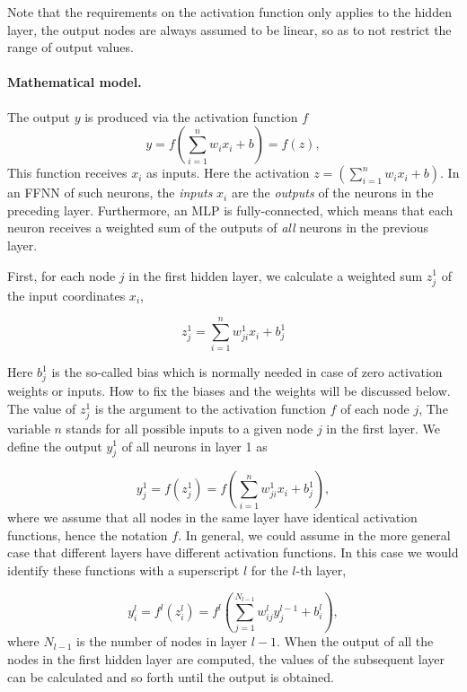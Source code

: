 \documentclass[%
oneside,                 %
final,                   %
10pt]{article}
\begin{document}
Note that the requirements on the activation function only applies to
the hidden layer, the output nodes are always assumed to be linear, so
as to not restrict the range of output values.


\paragraph{Mathematical model.}
The output $y$ is produced via the activation function $f$
\[
 y = f\left(\sum_{i=1}^n w_ix_i + b \right) = f(z),
\]
This function receives $x_i$ as inputs.
Here the activation $z=(\sum_{i=1}^n w_ix_i+b)$. 
In an FFNN of such neurons, the \emph{inputs} $x_i$ are the \emph{outputs} of
the neurons in the preceding layer. Furthermore, an MLP is
fully-connected, which means that each neuron receives a weighted sum
of the outputs of \emph{all} neurons in the previous layer.

First, for each node $j$ in the first hidden layer, we calculate a weighted sum $z_j^1$ of the input coordinates $x_i$,

\begin{equation} z_j^1 = \sum_{i=1}^{n} w_{ji}^1 x_i + b_j^1
\end{equation}

Here $b_j^1$ is the so-called bias which is normally needed in
case of zero activation weights or inputs. How to fix the biases and
the weights will be discussed below.  The value of $z_j^1$ is the
argument to the activation function $f$ of each node $j$, The
variable $n$ stands for all possible inputs to a given node $j$ in the
first layer.  We define  the output $y_j^1$ of all neurons in layer 1 as

\begin{equation}
 y_j^1 = f(z_j^1) = f\left(\sum_{i=1}^n w_{ji}^1 x_i  + b_j^1\right),
 \label{outputLayer1}
\end{equation}
where we assume that all nodes in the same layer have identical
activation functions, hence the notation $f$. In general, we could assume in the more general case that different layers have different activation functions.
In this case we would identify these functions with a superscript $l$ for the $l$-th layer,

\begin{equation}
 y_i^l = f^l(z_i^l) = f^l\left(\sum_{j=1}^{N_{l-1}} w_{ij}^l y_j^{l-1} + b_i^l\right),
 \label{generalLayer}
\end{equation}
where $N_{l-1}$ is the number of nodes in layer $l-1$. When the output of
all the nodes in the first hidden layer are computed, the values of
the subsequent layer can be calculated and so forth until the output
is obtained.
\end{document}

